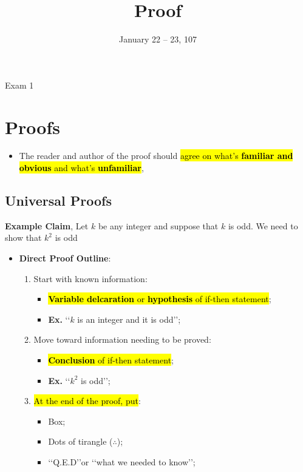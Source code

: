 \documentclass{note}
\date{January 22 -- 23, 107}
\title{Proof}
\begin{document}
    \begin{note}{Exam 1}

        \section{Proofs}

        \begin{itemize}
            \item The reader and author of the proof should \hl{agree on what's \textbf{familiar and obvious} 
            and what's \textbf{unfamiliar}}, 
        \end{itemize}

        \subsection{Universal Proofs}

        \textbf{Example Claim}, Let $ k $ be any integer and suppose that $ k $ is odd. 
        We need to show that $ k^{2} $ is odd

        \begin{itemize}
            
            \item \textbf{Direct Proof Outline}:

            \begin{enumerate}
                \item Start with known information:
                \begin{itemize}
                    \item \hl{\textbf{Variable delcaration} or \textbf{hypothesis} of if-then statement};
                    \item \textbf{Ex.} \lq\lq $ k $ is an integer and it is odd\rq\rq;
                \end{itemize} 

                \item Move toward information needing to be proved:
                \begin{itemize}
                    \item \hl{\textbf{Conclusion} of if-then statement};
                    \item \textbf{Ex.} \lq\lq $ k^{2} $ is odd\rq\rq;
                \end{itemize}

                \item \hl{At the end of the proof, put}:
                \begin{itemize}
                    \item Box;
                    \item Dots of tirangle ($ \therefore $);
                    \item \lq\lq Q.E.D\rq\rq or \lq\lq what we needed to know\rq\rq;
                \end{itemize}
            \end{enumerate}


\end{itemize}
\end{note}
\end{document}
